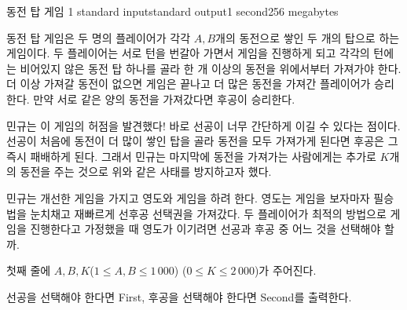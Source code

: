 \begin{problem}{동전 탑 게임 1 }{standard input}{standard output}{1 second}{256 megabytes}

동전 탑 게임은 두 명의 플레이어가 각각 $A, B$개의 동전으로 쌓인 두 개의 탑으로 하는 게임이다. 두 플레이어는 서로 턴을 번갈아 가면서 게임을 진행하게 되고 각각의 턴에는 비어있지 않은 동전 탑 하나를 골라 한 개 이상의 동전을 위에서부터 가져가야 한다. 더 이상 가져갈 동전이 없으면 게임은 끝나고 더 많은 동전을 가져간 플레이어가 승리한다. 만약 서로 같은 양의 동전을 가져갔다면 후공이 승리한다.

민규는 이 게임의 허점을 발견했다! 바로 선공이 너무 간단하게 이길 수 있다는 점이다. 선공이 처음에 동전이 더 많이 쌓인 탑을 골라 동전을 모두 가져가게 된다면 후공은 그 즉시 패배하게 된다. 그래서 민규는 마지막에 동전을 가져가는 사람에게는 추가로 $K$개의 동전을 주는 것으로 위와 같은 사태를 방지하고자 했다.

민규는 개선한 게임을 가지고 영도와 게임을 하려 한다. 영도는 게임을 보자마자 필승법을 눈치채고 재빠르게 선후공 선택권을 가져갔다. 두 플레이어가 최적의 방법으로 게임을 진행한다고 가정했을 때 영도가 이기려면 선공과 후공 중 어느 것을 선택해야 할까.

\InputFile
첫째 줄에 $A,B,K$($1 \le A, B \le 1\,000$) ($0 \le K \le 2\,000$)가 주어진다.

\OutputFile
선공을 선택해야 한다면 First, 후공을 선택해야 한다면 Second를 출력한다.

\Examples

\begin{example}
%
%
\end{example}

\end{problem}

